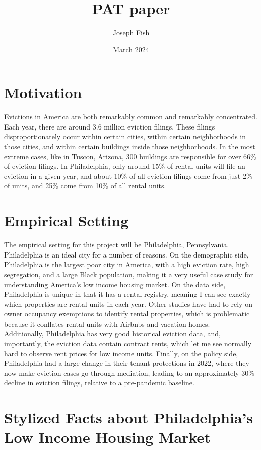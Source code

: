 \documentclass{article}
\title{PAT paper}
\author{Joseph Fish}
\date{March 2024}
\begin{document}
\section{Motivation}

Evictions in America are both remarkably common and remarkably concentrated. Each year, there are around 3.6 million eviction filings. These filings disproportionately occur within certain cities, within certain neighborhoods in those cities, and within certain buildings inside those neighborhoods. In the most extreme cases, like in Tuscon, Arizona, 300 buildings are responsible for over 66\% of eviction filings. In Philadelphia, only around 15\% of rental units will file an eviction in a given year, and about 10\% of all eviction filings come from just 2\% of units, and 25\% come from 10\% of all rental units. \\



\section{Empirical Setting}

The empirical setting for this project will be Philadelphia, Pennsylvania. Philadelphia is an ideal city for a number of reasons. On the demographic side, Philadelphia is the largest poor city in America, with a high eviction rate, high segregation, and a large Black population, making it a very useful case study for understanding America's low income housing market. On the data side, Philadelphia is unique in that it has a rental registry, meaning I can see exactly which properties are rental units in each year. Other studies have had to rely on owner occupancy exemptions to identify rental properties, which is problematic because it conflates rental units with Airbnbs and vacation homes. \\

Additionally, Philadelphia has very good historical eviction data, and, importantly, the eviction data contain contract rents, which let me see normally hard to observe rent prices for low income units. Finally, on the policy side, Philadelphia had a large change in their tenant protections in 2022, where they now make eviction cases go through mediation, leading to an approximately 30\% decline in eviction filings, relative to a pre-pandemic baseline.

\section{Stylized Facts about Philadelphia's Low Income Housing Market}
\end{document}
